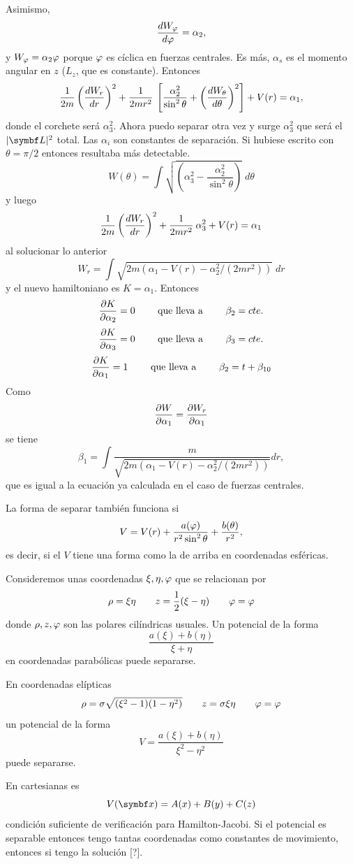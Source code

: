 \documentclass[10pt,oneside]{CBFT_book}
\begin{document}
Asimismo,
\[
	\frac{d^{\hspace{-0.05em}} {W_\varphi}}{d {\varphi}^{\hspace{-0.05em}}} = \alpha_2,
\]
y $W_\varphi = \alpha_2 \varphi$ porque $\varphi$ es cíclica en fuerzas centrales. Es más, $\alpha_s$ es el momento angular
en $z$ ($L_z$, que es constante).
Entonces
\[
	\frac{1}{2m} \left( \frac{d^{\hspace{-0.05em}} {W_r}}{d {r}^{\hspace{-0.05em}}} \right)^2 + \frac{1}{2mr^2} \:
	\left[ \frac{\alpha_2^2}{\sin^2\theta} + \left( \frac{d^{\hspace{-0.05em}} {W_\theta}}{d {\theta}^{\hspace{-0.05em}}} \right)^2 \right]  + V(r) = \alpha_1,
\]
donde el corchete será $\alpha_3^2$. Ahora puedo separar otra vez y surge $\alpha_3^2$ que será el $|\vb{L}|^2$ total.
Las $\alpha_i$ son constantes de separación.
Si hubiese escrito con $\theta = \pi / 2$ entonces resultaba más detectable.
\[
	W(\theta) = \int \sqrt{ \left( \alpha_3^2 - \frac{\alpha_2^2}{\sin^2\theta} \right) } \; d\theta
\]
y luego
\[
	\frac{1}{2m} \left( \frac{d^{\hspace{-0.05em}} {W_r}}{d {r}^{\hspace{-0.05em}}} \right)^2 + \frac{1}{2mr^2} \: \alpha_3^2 + V(r) = \alpha_1
\]
al solucionar lo anterior
\[
	W_r = \int \sqrt{ 2 m ( \alpha_1 - V(r) - \alpha_2^2 / (2mr^2) ) } \; dr
\]
y el nuevo hamiltoniano es $ K = \alpha_1 $. Entonces
\[
	\frac{\partial^{\hspace{-0.05em}} {K}}{\partial {\alpha_2}^{\hspace{-0.05em}}} = 0 \qquad \text{ que lleva a } \qquad \beta_2 = cte.
\]
\[
	\frac{\partial^{\hspace{-0.05em}} {K}}{\partial {\alpha_3}^{\hspace{-0.05em}}} = 0 \qquad \text{ que lleva a } \qquad \beta_3 = cte.
\]
\[
	\frac{\partial^{\hspace{-0.05em}} {K}}{\partial {\alpha_1}^{\hspace{-0.05em}}} = 1 \qquad \text{ que lleva a } \qquad \beta_2 = t + \beta_{10}
\]
Como
\[
	\frac{\partial^{\hspace{-0.05em}} {W}}{\partial {\alpha_1}^{\hspace{-0.05em}}} = \frac{\partial^{\hspace{-0.05em}} {W_r}}{\partial {\alpha_1}^{\hspace{-0.05em}}}
\]
se tiene 
\[
	\beta_1 = \int \frac{m}{\sqrt{ 2 m ( \alpha_1 - V(r) - \alpha_2^2 / (2mr^2) ) }} dr,
\]
que es igual a la ecuación ya calculada en el caso de fuerzas centrales.

La forma de separar también funciona si
\[
	V = V(r) + \frac{a(\varphi)}{r^2 \sin ^2 \theta} + \frac{b(\theta)}{r^2},
\]
es decir, si el $V$ tiene una forma como la de arriba en coordenadas esféricas.

Consideremos unas coordenadas $\xi,\eta,\varphi$ que se relacionan por
\[
	\rho = \xi \eta \qquad z = \frac{1}{2}( \xi - \eta ) \qquad \varphi = \varphi
\]
donde $\rho,z,\varphi$ son las polares cilíndricas usuales.
Un potencial de la forma 
\[
	\frac{ a(\xi) + b( \eta ) }{ \xi + \eta }
\]
en coordenadas parabólicas puede separarse.

En coordenadas elípticas
\[
	\rho = \sigma \sqrt{ ( \xi^2 - 1 )( 1 - \eta^2 ) } \qquad z = \sigma \xi \eta \qquad \varphi = \varphi
\]
un potencial de la forma 
\[
	V = \frac{ a(\xi) + b( \eta ) }{ \xi^2 - \eta^2 }
\]
puede separarse.

En cartesianas es
\[
	V(\vb{x}) = A(x) + B(y) + C(z)
\]
condición suficiente de verificación para Hamilton-Jacobi. Si el potencial es separable entonces tengo tantas coordenadas como 
constantes de movimiento, entonces si tengo la solución [?].
\end{document}
